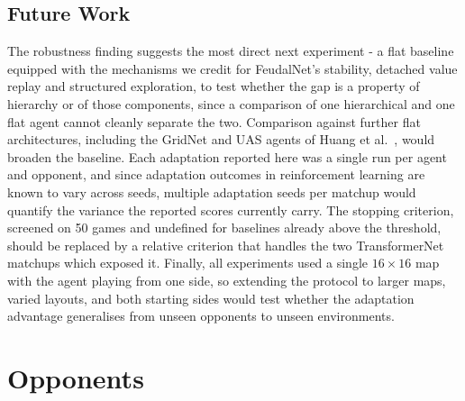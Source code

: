 \documentclass[sigconf,review=false]{acmart}
\begin{document}
\subsection{Future Work}
The robustness finding suggests the most direct next experiment - a flat baseline equipped with the mechanisms we credit for FeudalNet's stability, detached value replay and structured exploration, to test whether the gap is a property of hierarchy or of those components, since a comparison of one hierarchical and one flat agent cannot cleanly separate the two. Comparison against further flat architectures, including the GridNet and UAS agents of Huang et al.~\cite{micrortsgridnet}, would broaden the baseline. 
Each adaptation reported here was a single run per agent and opponent, and since adaptation outcomes in reinforcement learning are known to vary across seeds, multiple adaptation seeds per matchup would quantify the variance the reported scores currently carry.
The stopping criterion, screened on 50 games and undefined for baselines already above the threshold, should be replaced by a relative criterion that handles the two TransformerNet matchups which exposed it.
Finally, all experiments used a single $16{\times}16$ map with the agent playing from one side, so extending the protocol to larger maps, varied layouts, and both starting sides would test whether the adaptation advantage generalises from unseen opponents to unseen environments.




\clearpage
\appendix

\section{Opponents}
\end{document}
